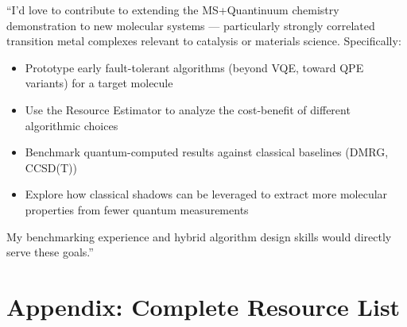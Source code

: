 \documentclass[11pt,a4paper]{article}
\begin{document}
\begin{answerbox}
``I'd love to contribute to extending the MS+Quantinuum chemistry demonstration to new molecular systems --- particularly strongly correlated transition metal complexes relevant to catalysis or materials science. Specifically:
\begin{itemize}
    \item Prototype early fault-tolerant algorithms (beyond VQE, toward QPE variants) for a target molecule
    \item Use the Resource Estimator to analyze the cost-benefit of different algorithmic choices
    \item Benchmark quantum-computed results against classical baselines (DMRG, CCSD(T))
    \item Explore how classical shadows can be leveraged to extract more molecular properties from fewer quantum measurements
\end{itemize}
My benchmarking experience and hybrid algorithm design skills would directly serve these goals.''
\end{answerbox}


\newpage
\appendix
\part*{Appendix: Complete Resource List}
\end{document}
